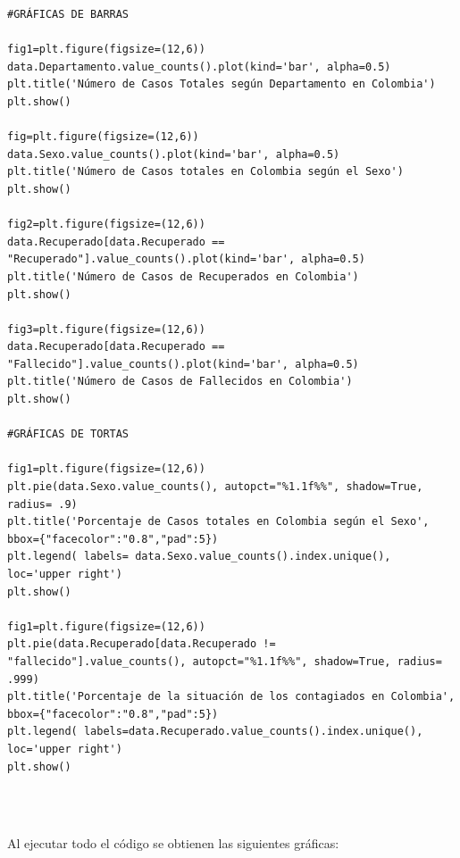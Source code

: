 \documentclass[conference,compsoc,onecolumn]{IEEEtran}
\begin{document}
\begin{lstlisting}
#GRÁFICAS DE BARRAS

fig1=plt.figure(figsize=(12,6))
data.Departamento.value_counts().plot(kind='bar', alpha=0.5)
plt.title('Número de Casos Totales según Departamento en Colombia')
plt.show()

fig=plt.figure(figsize=(12,6))
data.Sexo.value_counts().plot(kind='bar', alpha=0.5)
plt.title('Número de Casos totales en Colombia según el Sexo')
plt.show()

fig2=plt.figure(figsize=(12,6))
data.Recuperado[data.Recuperado == "Recuperado"].value_counts().plot(kind='bar', alpha=0.5)
plt.title('Número de Casos de Recuperados en Colombia')
plt.show()

fig3=plt.figure(figsize=(12,6))
data.Recuperado[data.Recuperado == "Fallecido"].value_counts().plot(kind='bar', alpha=0.5)
plt.title('Número de Casos de Fallecidos en Colombia')
plt.show()

#GRÁFICAS DE TORTAS

fig1=plt.figure(figsize=(12,6))
plt.pie(data.Sexo.value_counts(), autopct="%1.1f%%", shadow=True, radius= .9)
plt.title('Porcentaje de Casos totales en Colombia según el Sexo', bbox={"facecolor":"0.8","pad":5})
plt.legend( labels= data.Sexo.value_counts().index.unique(), loc='upper right')
plt.show()

fig1=plt.figure(figsize=(12,6))
plt.pie(data.Recuperado[data.Recuperado != "fallecido"].value_counts(), autopct="%1.1f%%", shadow=True, radius= .999)
plt.title('Porcentaje de la situación de los contagiados en Colombia', bbox={"facecolor":"0.8","pad":5})
plt.legend( labels=data.Recuperado.value_counts().index.unique(), loc='upper right')
plt.show()

\end{lstlisting}
\\\

Al ejecutar todo el código se obtienen las siguientes gráficas:
\\\
\end{document}
